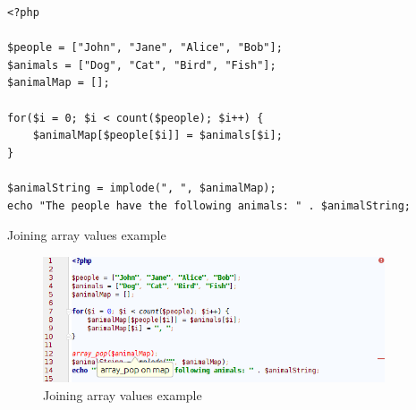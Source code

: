 \begin{program}
\begin{lstlisting}
<?php

$people = ["John", "Jane", "Alice", "Bob"];
$animals = ["Dog", "Cat", "Bird", "Fish"];
$animalMap = [];

for($i = 0; $i < count($people); $i++) {
    $animalMap[$people[$i]] = $animals[$i];
}

$animalString = implode(", ", $animalMap);
echo "The people have the following animals: " . $animalString;
\end{lstlisting}
\caption{Joining array values example}
\label{lst:arrayPopExampleFixed}
\end{program}

\begin{figure}
\centering
\includegraphics[width=0.9\textwidth]{chapters/caseStudy/screens/pop}
\caption{Joining array values example}
\label{fig:arrayPopScreenshot}
\end{figure}





